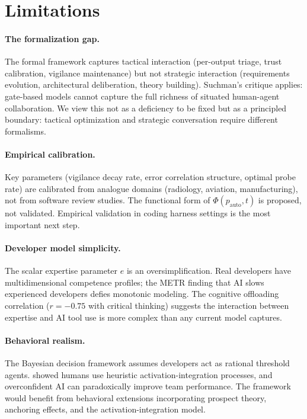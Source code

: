 \documentclass[11pt, a4paper, copyright]{googledeepmind}
\begin{document}
\section{Limitations}
\label{sec:limitations}

\paragraph{The formalization gap.} The formal framework captures tactical interaction (per-output triage, trust calibration, vigilance maintenance) but not strategic interaction (requirements evolution, architectural deliberation, theory building). Suchman's critique \citep{suchman1987plans} applies: gate-based models cannot capture the full richness of situated human-agent collaboration. We view this not as a deficiency to be fixed but as a principled boundary: tactical optimization and strategic conversation require different formalisms.

\paragraph{Empirical calibration.} Key parameters (vigilance decay rate, error correlation structure, optimal probe rate) are calibrated from analogue domains (radiology, aviation, manufacturing), not from software review studies. The functional form of $\Phi(p_{\text{auto}}, t)$ is proposed, not validated. Empirical validation in coding harness settings is the most important next step.

\paragraph{Developer model simplicity.} The scalar expertise parameter $e$ is an oversimplification. Real developers have multidimensional competence profiles; the METR finding that AI slows experienced developers defies monotonic modeling. The cognitive offloading correlation ($r = -0.75$ with critical thinking) suggests the interaction between expertise and AI tool use is more complex than any current model captures.

\paragraph{Behavioral realism.} The Bayesian decision framework assumes developers act as rational threshold agents. \citet{vodrahalli2022uncalibrated} showed humans use heuristic activation-integration processes, and overconfident AI can paradoxically improve team performance. The framework would benefit from behavioral extensions incorporating prospect theory, anchoring effects, and the activation-integration model.
\end{document}
